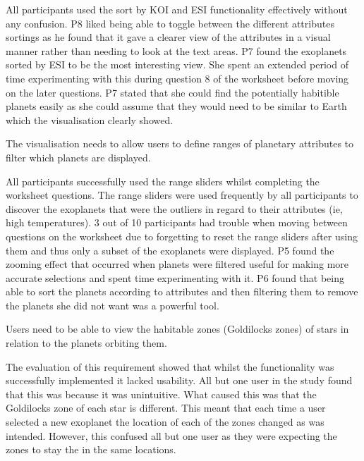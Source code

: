 \begin{enumerate}
All participants used the sort by KOI and ESI functionality effectively without
any confusion. P8 liked being able to toggle between the different attributes
sortings as he found that it gave a clearer view of the attributes in a visual
manner rather than needing to look at the text areas.
P7 found the exoplanets sorted by ESI to be the most interesting view. She
spent an extended period of time experimenting with this during question 8 of the
worksheet before moving on the later questions. P7 stated that she could find
the potentially habitible planets easily as she could assume that they would
need to be similar to Earth which the visualisation clearly showed.

{\bf \item[R4.] The visualisation needs to allow users to define ranges of
planetary attributes to filter which planets are displayed.}

All participants successfully used the range sliders whilst completing the
worksheet questions. The range sliders were used frequently by all participants to discover the
exoplanets that were the outliers in regard to their attributes (ie, high
temperatures). 3 out of 10 participants had trouble when moving between
questions on the worksheet due to forgetting
to reset the range sliders after using them and thus only a subset of the
exoplanets were displayed. 
P5 found the zooming effect that occurred when planets were filtered useful for making more accurate selections and spent time
experimenting with it. P6 found that being able to sort the planets according to
attributes and
then filtering them to remove the planets she did not want was a powerful tool.

{\bf \item[R5.] Users need to be able to view the habitable zones (Goldilocks zones) of stars in
relation to the planets orbiting them.}

The evaluation of this requirement showed that whilst the functionality was
successfully implemented it lacked usability. All but one user in the study
found that this was because it was unintuitive. What caused this was that the
Goldilocks zone of each star is different. This meant that each time a user
selected a new exoplanet the location of each of the zones changed as was
intended. However, this confused all but one user as they were expecting the
zones to stay the in the same locations.  

\end{enumerate}

